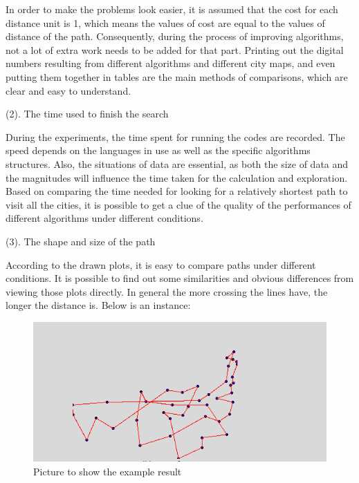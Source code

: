 \documentclass{article}
\begin{document}
In order to make the problems look easier, it is assumed that the cost for each distance unit is 1, which means the values of cost are equal to the values of distance of the path. Consequently, during the process of improving algorithms, not a lot of extra work needs to be added for that part. Printing out the digital numbers resulting from different algorithms and different city maps, and even putting them together in tables are the main methods of comparisons, which are clear and easy to understand. 

(2). The time used to finish the search

During the experiments, the time spent for running the codes are recorded. The speed depends on the languages in use as well as the  specific algorithms structures. Also, the situations of data are essential, as both the size of data and the magnitudes will influence the time taken for the calculation and exploration. Based on comparing the time needed for looking for a relatively shortest path to visit all the cities, it is possible to get a clue of the quality of the performances of different algorithms under different conditions. 

(3). The shape and size of the path 

According to the drawn plots, it is easy to compare paths under different conditions. It is possible to find out some similarities and obvious differences from viewing those plots directly. In general the more crossing the lines have, the longer the distance is. Below is an instance:

\bigskip
\begin{figure}[h]
  \begin{center}
    \includegraphics[scale=0.6]{image2}
  \end{center}
  \caption{Picture to show the example result}
\end{figure}
\bigskip
\end{document}
